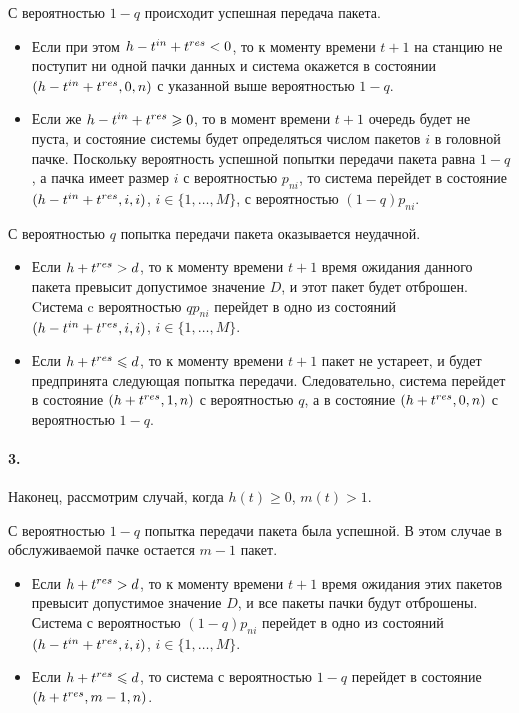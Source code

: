 С вероятностью $1 - q$ происходит успешная передача пакета.

\begin{itemize}
\item Если при этом $h - t^{in} + t^{res} < 0$, то к моменту времени $t + 1$ на станцию не поступит ни одной пачки данных и система окажется в состоянии $(h - t^{in} + t^{res}, 0, n)$ с указанной выше вероятностью $1 - q$.
\item Если же $h - t^{in} + t^{res} \geqslant 0$, то в момент времени $t + 1$ очередь будет не пуста, и состояние системы будет определяться числом пакетов $i$ в головной пачке. Поскольку вероятность успешной попытки передачи пакета равна  $1 - q$, а пачка имеет размер $i$ с вероятностью $p_{ni}$, то система перейдет в состояние $(h - t^{in} + t^{res}, i, i)$, $i \in \{1, \dots, M\}$, с вероятностью $(1 - q)p_{ni}$.
\end{itemize} 

С вероятностью $q$ попытка передачи пакета оказывается неудачной. 

\begin{itemize}
\item Если $h + t^{res} > d$, то к моменту времени $t + 1$ время ожидания данного пакета  превысит допустимое значение $D$, и этот пакет будет отброшен. Cистема c вероятностью $qp_{ni}$ перейдет в одно из состояний $(h - t^{in} + t^{res}, i, i)$, $i \in \{1, \dots, M\}$.
\item Если $h + t^{res} \leqslant d$, то к моменту времени $t + 1$ пакет не устареет, и будет предпринята следующая попытка передачи. Следовательно, система перейдет в состояние $(h + t^{res}, 1, n)$ с вероятностью $q$, а в состояние $(h + t^{res}, 0, n)$ с вероятностью $1 - q$.
\end{itemize} 

\paragraph{3.} Наконец, рассмотрим случай, когда $h(t) \geqslant 0$, $m(t) > 1$. 

С вероятностью $1 - q$ попытка передачи пакета была успешной. В этом случае в обслуживаемой пачке остается $m - 1$ пакет. 

\begin{itemize}
\item Если $h + t^{res} > d$, то к моменту времени $t + 1$ время ожидания этих пакетов превысит допустимое значение $D$, и все пакеты пачки будут отброшены. Система с вероятностью $(1-q)p_{ni}$ перейдет в одно из состояний $(h - t^{in} + t^{res}, i, i)$, $i \in \{1, \dots, M\}$. 
\item Если $h + t^{res} \leqslant d$, то система с вероятностью $1-q$ перейдет в состояние $(h + t^{res}, m - 1, n)$.
\end{itemize} 

